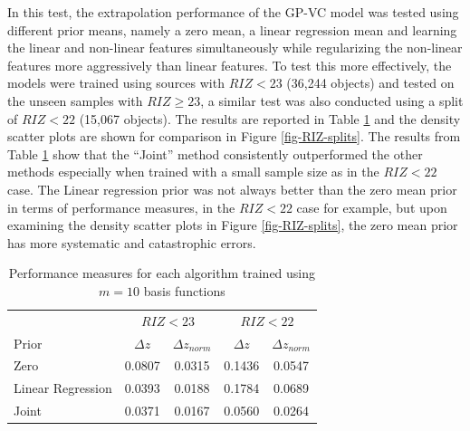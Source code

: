 \documentclass[useAMS,usenatbib,fleqn]{mn2e}
\begin{document}
In this test, the extrapolation performance of the GP-VC model was tested using different prior means, namely a zero mean, a linear regression mean and learning the linear and non-linear features simultaneously while regularizing the non-linear features more aggressively than linear features. To test this more effectively,  the models were trained using sources with $RIZ<23$ (36,244 objects) and tested on the unseen samples with $RIZ\ge23$, a similar test was also conducted using a split of $RIZ<22$ (15,067 objects). The results are reported in Table \ref{table-RIZ-splits} and the density scatter plots are shown for comparison in Figure \ref{fig-RIZ-splits}. The results from Table \ref{table-RIZ-splits} show that the ``Joint'' method consistently outperformed the other methods especially when trained with a small sample size as in the $RIZ<22$ case. The Linear regression prior was not always better than the zero mean prior in terms of performance measures, in the $RIZ<22$ case for example, but upon examining the density scatter plots in Figure \ref{fig-RIZ-splits}, the zero mean prior has more systematic and catastrophic errors.

 \begin{table}
\caption{Performance measures for each algorithm trained using $m=10$ basis functions}
\begin{center}
  \begin{tabular}{| l | c | c | c | c | }
  							& 	\multicolumn{2}{|c|}{$RIZ<23$}	& 	\multicolumn{2}{c}{$RIZ<22$} \\ \cline{2-5}
     	Prior					&	$\Delta z$	&	$\Delta z_{norm}$&	$\Delta z$	&	$\Delta z_{norm}$	\\	\hline
	Zero					&	0.0807		&	0.0315				&	0.1436		&	0.0547					\\	 
	Linear Regression		&	0.0393		&	0.0188				&	0.1784		&	0.0689					\\ 
	Joint					&	0.0371		&	0.0167				&	0.0560		&	0.0264					\\	\hline
  \end{tabular}
  \label{table-RIZ-splits}
\end{center}
\end{table}
\end{document}
